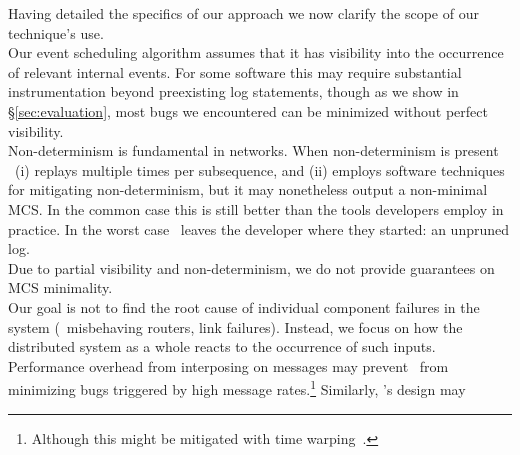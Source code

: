 Having detailed the specifics of our approach we now
clarify the scope of our technique's use.\\[0.5ex]
%
 Our event scheduling algorithm assumes that
it has visibility into the occurrence of relevant internal events. For
some software this may require substantial instrumentation beyond
preexisting log statements, though as we show in \S\ref{sec:evaluation}, most bugs
we encountered can be minimized without perfect visibility.\\[0.5ex]
%
 Non-determinism
is fundamental in networks. When non-determinism is present
\projectname~(i) replays multiple times per subsequence, and (ii) employs
software techniques for mitigating non-determinism, but it may nonetheless
output a non-minimal MCS. In the common case this is still
better than the tools developers employ in practice.
In the worst case \projectname~leaves the
developer where they started: an unpruned log.\\[0.5ex]
%
 Due to partial visibility and
non-determinism, we do not provide guarantees on MCS minimality.\\[0.5ex]
%
%
%
 Our goal is not to find the root
cause of individual component failures in the system (\eg~misbehaving routers,
link failures). Instead, we focus on
how the distributed system as a whole reacts to the occurrence of such
inputs.\\[0.5ex]
%
 Performance overhead from interposing on
messages may prevent \projectname~from minimizing bugs triggered by
high message rates.\footnote{Although this might be mitigated with
time warping~\cite{Gupta06toinfinity}.} Similarly, \projectname's design may
